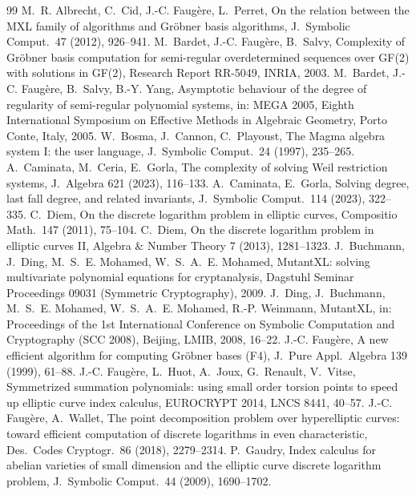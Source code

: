 \documentclass[11pt,a4paper]{article}
\theoremstyle{remark}\newtheorem{remark}{Remark}
\begin{document}
\begin{thebibliography}{99}\small
{} M.~R. Albrecht, C.~Cid, J.-C. Faugère, L.~Perret, On the relation between the MXL family of algorithms and Gröbner basis algorithms, J.~Symbolic Comput.\ 47 (2012), 926--941.
 M.~Bardet, J.-C. Faugère, B.~Salvy, Complexity of Gröbner basis computation for semi-regular overdetermined sequences over GF(2) with solutions in GF(2), Research Report RR-5049, INRIA, 2003.
 M.~Bardet, J.-C. Faugère, B.~Salvy, B.-Y. Yang, Asymptotic behaviour of the degree of regularity of semi-regular polynomial systems, in: MEGA 2005, Eighth International Symposium on Effective Methods in Algebraic Geometry, Porto Conte, Italy, 2005.
 W.~Bosma, J.~Cannon, C.~Playoust, The Magma algebra system I: the user language, J.~Symbolic Comput.\ 24 (1997), 235--265.
 A.~Caminata, M.~Ceria, E.~Gorla, The complexity of solving Weil restriction systems, J.~Algebra 621 (2023), 116--133.
 A.~Caminata, E.~Gorla, Solving degree, last fall degree, and related invariants, J.~Symbolic Comput.\ 114 (2023), 322--335.
 C.~Diem, On the discrete logarithm problem in elliptic curves, Compositio Math.\ 147 (2011), 75--104.
 C.~Diem, On the discrete logarithm problem in elliptic curves II, Algebra \& Number Theory 7 (2013), 1281--1323.
 J.~Buchmann, J.~Ding, M.~S.~E. Mohamed, W.~S.~A.~E. Mohamed, MutantXL: solving multivariate polynomial equations for cryptanalysis, Dagstuhl Seminar Proceedings 09031 (Symmetric Cryptography), 2009.
 J.~Ding, J.~Buchmann, M.~S.~E. Mohamed, W.~S.~A.~E. Mohamed, R.-P. Weinmann, MutantXL, in: Proceedings of the 1st International Conference on Symbolic Computation and Cryptography (SCC 2008), Beijing, LMIB, 2008, 16--22.
 J.-C. Faugère, A new efficient algorithm for computing Gröbner bases (F4), J.~Pure Appl.\ Algebra 139 (1999), 61--88.
 J.-C. Faugère, L.~Huot, A.~Joux, G.~Renault, V.~Vitse, Symmetrized summation polynomials: using small order torsion points to speed up elliptic curve index calculus, EUROCRYPT 2014, LNCS 8441, 40--57.
 J.-C. Faugère, A.~Wallet, The point decomposition problem over hyperelliptic curves: toward efficient computation of discrete logarithms in even characteristic, Des.\ Codes Cryptogr.\ 86 (2018), 2279--2314.
 P.~Gaudry, Index calculus for abelian varieties of small dimension and the elliptic curve discrete logarithm problem, J.~Symbolic Comput.\ 44 (2009), 1690--1702.

\end{thebibliography}
\end{document}
